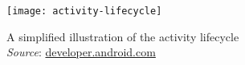 %
%


\begin{frame}[plain]

  \begin{figure}
    \centering
    \texttt{[image: activity-lifecycle]}
    \caption{A simplified illustration of the activity lifecycle \\
      \emph{Source}: \url{developer.android.com}}
    \label{fig:android-lifecycle}
  \end{figure}
  
\end{frame}


